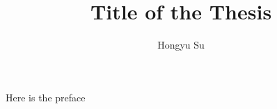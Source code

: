 \documentclass[dissertation]{aaltoseries}
\author{Hongyu Su}
\title{Title of the Thesis}
\begin{document}
\draftabstract{\lipsum[1-3]}
\draftabstract[finnish]{\lipsum[4-6]}
\draftabstract[swedish]{\lipsum[7-9]}

\begin{preface}[Espoo]
	Here is the preface
	\lipsum[1-2]
\end{preface}

\tableofcontents

\listofpublications


%






\end{document}
